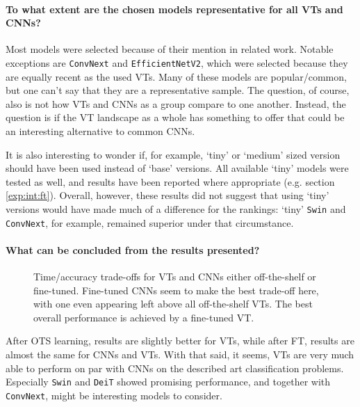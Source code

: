 
\paragraph{To what extent are the chosen models representative for all VTs and CNNs?}
Most models were selected because of their mention in related work. Notable exceptions are \texttt{ConvNext} and \texttt{EfficientNetV2}, which were selected because they are equally recent as the used VTs. Many of these models are popular/common, but one can't say that they are a representative sample. The question, of course, also is not how VTs and CNNs as a group compare to one another. Instead, the question is if the VT landscape as a whole has something to offer that could be an interesting alternative to common CNNs.

It is also interesting to wonder if, for example, `tiny' or `medium' sized version should have been used instead of `base' versions. All available `tiny' models were tested as well, and results have been reported where appropriate (e.g. section \ref{exp:int:ft}). Overall, however, these results did not suggest that using `tiny' versions would have made much of a difference for the rankings: `tiny' \texttt{Swin} and \texttt{ConvNext}, for example, remained superior under that circumstance.

\paragraph{What can be concluded from the results presented?}

\begin{figure}[tbh]
    \centering
    \def\svgwidth{7.7cm}
    
    \caption{Time/accuracy trade-offs for VTs and CNNs either off-the-shelf or fine-tuned. Fine-tuned CNNs seem to make the best trade-off here, with one even appearing left above all off-the-shelf VTs. The best overall performance is achieved by a fine-tuned VT.}
    \label{results:img:ots_vs_ft_type}
\end{figure}

After OTS learning, results are slightly better for VTs, while after FT, results are almost the same for CNNs and VTs. With that said, it seems, VTs are very much able to perform on par with CNNs on the described art classification problems. Especially \texttt{Swin} and \texttt{DeiT} showed promising performance, and together with \texttt{ConvNext}, might be interesting models to consider.

